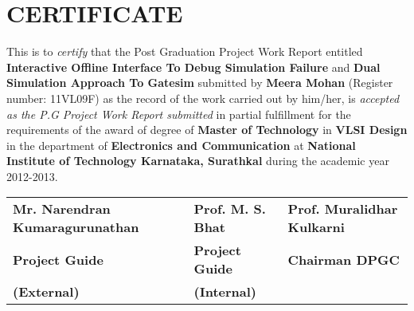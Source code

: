 \section*{\centering CERTIFICATE}
This is to \emph{certify} that the Post Graduation Project Work Report entitled 
{\bf Interactive Offline Interface To Debug Simulation Failure} and {\bf Dual Simulation Approach To Gatesim} 
submitted by {\bf Meera Mohan} (Register number: 11VL09F) as the 
record of the work carried out by him/her, is \emph{accepted as the  
P.G Project Work Report submitted} in partial fulfillment for 
the requirements of the award of degree of {\bf Master of Technology} 
in {\bf VLSI Design} in the department of {\bf Electronics and Communication} 
at {\bf National Institute of Technology Karnataka, Surathkal} during the 
academic year 2012-2013.

\vspace{1.4in}

 \begin{tabular}{lll}
 \hspace{-1cm}\bf{Mr. Narendran Kumaragurunathan}	&\hspace{.7cm}\bf{Prof. M. S. Bhat}	 &\hspace{.7cm}\bf{Prof. Muralidhar Kulkarni}	\\
 \hspace{-1cm}\bf{Project Guide} &\hspace{.7cm}\bf{Project Guide}		&\hspace{.7cm}\bf{Chairman DPGC}\\
 \hspace{-1cm}\bf{(External)}   	&\hspace{0.25in}\bf{(Internal)}\\

 \end{tabular}







